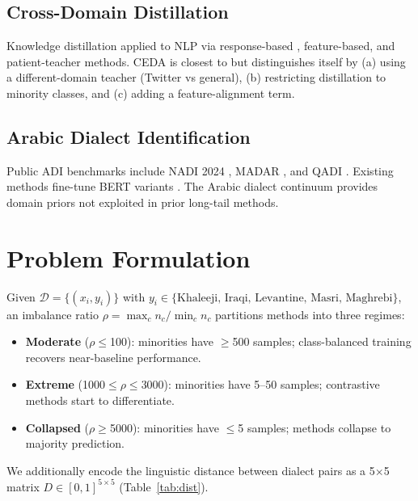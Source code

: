 \documentclass[11pt,a4paper,twocolumn]{article}
\newcommand{\ceda}{CEDA}
\begin{document}
\subsection{Cross-Domain Distillation}
Knowledge distillation \citep{Hinton2015} applied to NLP via response-based
\citep{Sanh2019}, feature-based, and patient-teacher
\citep{Sun2019} methods. \ceda{} is closest to \citet{Sanh2019} but
distinguishes itself by (a) using a different-domain teacher
(Twitter vs general), (b) restricting distillation to minority
classes, and (c) adding a feature-alignment term.

\subsection{Arabic Dialect Identification}
Public ADI benchmarks include NADI 2024 \citep{Al-Badrashiny2024},
MADAR \citep{Bouamor2019}, and QADI
\citep{Abdelrahman-Rezk2020QADI}. Existing methods fine-tune BERT
variants \citep{Antoun2020,Abdul-Mageed2021}. The Arabic dialect
continuum \citep{Versteegh2006,Habash2010} provides domain priors
not exploited in prior long-tail methods.

\section{Problem Formulation}
Given $\mathcal{D}=\{(x_i,y_i)\}$ with
$y_i\in\{\text{Khaleeji, Iraqi, Levantine, Masri, Maghrebi}\}$, an
imbalance ratio $\rho = \max_c n_c / \min_c n_c$ partitions methods
into three regimes:
\begin{itemize}\itemsep0pt
\item \textbf{Moderate} ($\rho\le$100): minorities have $\ge$500
samples; class-balanced training recovers near-baseline
performance.
\item \textbf{Extreme} (1000$\le\rho\le$3000): minorities have
5--50 samples; contrastive methods start to differentiate.
\item \textbf{Collapsed} ($\rho\ge$5000): minorities have $\le$5
samples; methods collapse to majority prediction.
\end{itemize}

We additionally encode the linguistic distance between dialect pairs
as a 5$\times$5 matrix $D \in [0,1]^{5\times 5}$ (Table~\ref{tab:dist}).
\end{document}
